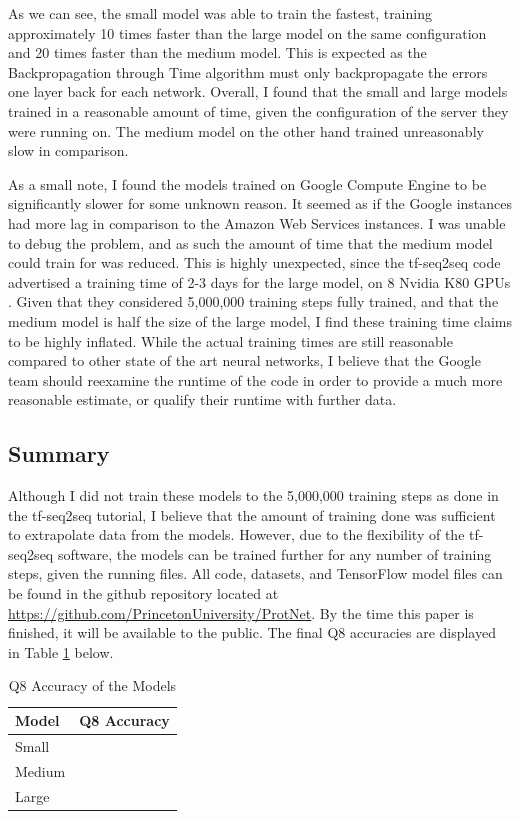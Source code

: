 \documentclass[pageno]{jpaper}
\begin{document}
As we can see, the small model was able to train the fastest, training approximately 10 times faster than the large model on the same configuration and 20 times faster than the medium model.  This is expected as the Backpropagation through Time algorithm must only backpropagate the errors one layer back for each network.  Overall, I found that the small and large models trained in a reasonable amount of time, given the configuration of the server they were running on.  The medium model on the other hand trained unreasonably slow in comparison.


\par
As a small note, I found the models trained on Google Compute Engine to be significantly slower for some unknown reason.  It seemed as if the Google instances had more lag in comparison to the Amazon Web Services instances.  I was unable to debug the problem, and as such the amount of time that the medium model could train for was reduced.  This is highly unexpected, since the tf-seq2seq code advertised a training time of 2-3 days for the large model, on 8 Nvidia K80 GPUs \cite{britz:2017}.  Given that they considered 5,000,000 training steps fully trained, and that the medium model is half the size of the large model, I find these training time claims to be highly inflated.  While the actual training times are still reasonable compared to other state of the art neural networks, I believe that the Google team should reexamine the runtime of the code in order to provide a much more reasonable estimate, or qualify their runtime with further data.

\subsection{Summary}
Although I did not train these models to the 5,000,000 training steps as done in the tf-seq2seq tutorial, I believe that the amount of training done was sufficient to extrapolate data from the models.  However, due to the flexibility of the tf-seq2seq software, the models can be trained further for any number of training steps, given the running files.  All code, datasets, and TensorFlow model files can be found in the github repository located at \url{https://github.com/PrincetonUniversity/ProtNet}.  By the time this paper is finished, it will be available to the public.  The final Q8 accuracies are displayed in Table \ref{tb:q8_accuracy} below.

\begin{table}[H]
	\centering
	\caption{Q8 Accuracy of the Models}
	\label{tb:q8_accuracy}
	\begin{tabular}{|l|l|}
		\hline
		\textbf{Model}  & \textbf{Q8 Accuracy} \\ \hline
		Small  &             \\ \hline
		Medium &             \\ \hline
		Large  &             \\ \hline
	\end{tabular}
\end{table}
\end{document}

